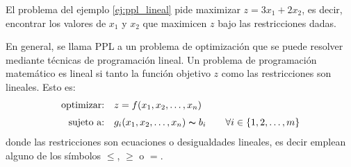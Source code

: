 El problema del ejemplo \ref{ej:ppl_lineal} pide maximizar \(z = 3x_1 + 2x_2\), es decir, encontrar los valores de \(x_1\) y \(x_2\) que maximicen \(z\) bajo las restricciones dadas.

En general, se llama PPL a un problema de optimización que se puede resolver mediante técnicas de programación lineal. Un problema de programación matemático es lineal si tanto la función objetivo \(z\) como las restricciones son lineales. Esto es:
\begin{align*}
  \text{optimizar:} \quad         &z = f(x_1, x_2, \ldots, x_n) \\[3pt]
  \text{sujeto a:} \quad    &g_i(x_1, x_2, \ldots, x_n) \thicksim  b_i \qquad \forall i \in \{1, 2, \ldots, m\} \\
\end{align*}
donde las restricciones son ecuaciones o desigualdades lineales, es decir emplean alguno de los símbolos \(\leq\), \(\geq\) o \(=\).